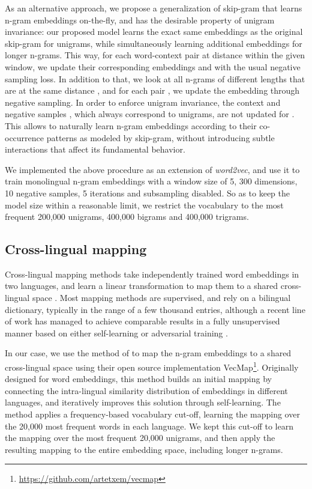 \documentclass[11pt,a4paper]{article}
\begin{document}
As an alternative approach, we propose a generalization of skip-gram that learns n-gram embeddings on-the-fly, and has the desirable property of unigram invariance: our proposed model learns the exact same embeddings as the original skip-gram for unigrams, while simultaneously learning additional embeddings for longer n-grams. This way, for each word-context pair  at distance  within the given window, we update their corresponding embeddings  and  with the usual negative sampling loss. In addition to that, we look at all n-grams  of different lengths that are at the same distance , and for each pair , we update the embedding  through negative sampling. In order to enforce unigram invariance, the context  and negative samples , which always correspond to unigrams, are not updated for . This allows to naturally learn n-gram embeddings according to their co-occurrence patterns as modeled by skip-gram, without introducing subtle interactions that affect its fundamental behavior.

We implemented the above procedure as an extension of \textit{word2vec}, and use it to train monolingual n-gram embeddings with a window size of 5, 300 dimensions, 10 negative samples, 5 iterations and subsampling disabled. So as to keep the model size within a reasonable limit, we restrict the vocabulary to the most frequent 200,000 unigrams, 400,000 bigrams and 400,000 trigrams.


\subsection{Cross-lingual mapping} \label{subsec:mapping}

Cross-lingual mapping methods take independently trained word embeddings in two languages, and learn a linear transformation to map them to a shared cross-lingual space \citep{mikolov2013exploiting,artetxe2018generalizing}. Most mapping methods are supervised, and rely on a bilingual dictionary, typically in the range of a few thousand entries, although a recent line of work has managed to achieve comparable results in a fully unsupervised manner based on either self-learning \citep{artetxe2017learning,artetxe2018robust} or adversarial training \citep{zhang2017adversarial,zhang2017earth,conneau2018word}.

In our case, we use the method of \citet{artetxe2018robust} to map the n-gram embeddings to a shared cross-lingual space using their open source implementation VecMap\footnote{\url{https://github.com/artetxem/vecmap}}. Originally designed for word embeddings, this method builds an initial mapping by connecting the intra-lingual similarity distribution of embeddings in different languages, and iteratively improves this solution through self-learning. The method applies a frequency-based vocabulary cut-off, learning the mapping over the 20,000 most frequent words in each language. We kept this cut-off to learn the mapping over the most frequent 20,000 unigrams, and then apply the resulting mapping to the entire embedding space, including longer n-grams.
\end{document}
